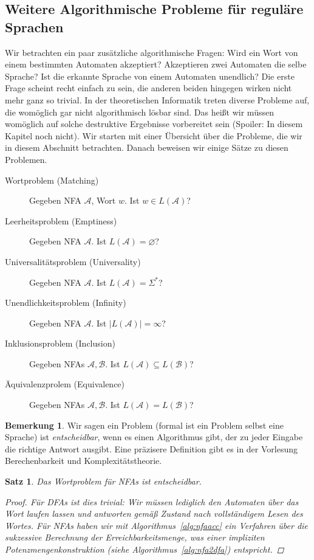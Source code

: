 \documentclass[11pt, a4paper]{article}
\theoremstyle{definition}
\newtheorem*{remark*}{Bemerkung}
\theoremstyle{plain}
\newtheorem{theorem}[definition]{Satz}
\numberwithin{equation}{section}
\let\emptyset\varnothing
\begin{document}
\subsection{Weitere Algorithmische Probleme für reguläre Sprachen}\label{sec:regular_algorithms}
Wir betrachten ein paar zusätzliche algorithmische Fragen: Wird ein Wort von einem bestimmten Automaten akzeptiert? Akzeptieren zwei Automaten die selbe Sprache? Ist die erkannte Sprache von einem Automaten unendlich? Die erste Frage scheint recht einfach zu sein, die anderen beiden hingegen wirken nicht mehr ganz so trivial. In der theoretischen Informatik treten diverse Probleme auf, die womöglich gar nicht algorithmisch lösbar sind. Das heißt wir müssen womöglich auf solche destruktive Ergebnisse vorbereitet sein (Spoiler: In diesem Kapitel noch nicht). Wir starten mit einer Übersicht über die Probleme, die wir in diesem Abschnitt betrachten. Danach beweisen wir einige Sätze zu diesen Problemen.
\begin{description}
	\item[Wortproblem (Matching)] Gegeben NFA $\mathcal{A}$, Wort $w$. Ist $w \in L(\mathcal{A})$?
	\item[Leerheitsproblem (Emptiness)] Gegeben NFA $\mathcal{A}$. Ist $L(\mathcal{A}) = \emptyset$?
	\item[Universalitätsproblem (Universality)] Gegeben NFA $\mathcal{A}$. Ist $L(\mathcal{A}) = \Sigma^\ast$?
	\item[Unendlichkeitsproblem (Infinity)] Gegeben NFA $\mathcal{A}$. Ist $|L(\mathcal{A})| = \infty$?
	\item[Inklusionsproblem (Inclusion)] Gegeben NFAs $\mathcal{A}, \mathcal{B}$. Ist $L(\mathcal{A}) \subseteq L(\mathcal{B})$?
	\item[Äquivalenzprolem (Equivalence)] Gegeben NFAs $\mathcal{A}, \mathcal{B}$. Ist $L(\mathcal{A}) = L(\mathcal{B})$?
\end{description}
\begin{remark*}
	Wir sagen ein Problem (formal ist ein Problem selbst eine Sprache) ist \textit{entscheidbar}, wenn es einen Algorithmus gibt, der zu jeder Eingabe die richtige Antwort ausgibt. Eine präzisere Definition gibt es in der Vorlesung Berechenbarkeit und Komplexitätstheorie.
\end{remark*}
\begin{theorem}\label{thm:nfa_matching}
	Das Wortproblem für NFAs ist entscheidbar.
	\begin{proof}
		Für DFAs ist dies trivial: Wir müssen lediglich den Automaten über das Wort laufen lassen und antworten gemäß Zustand nach vollständigem Lesen des Wortes. Für NFAs haben wir mit Algorithmus~\ref{alg:nfaacc} ein Verfahren über die sukzessive Berechnung der Erreichbarkeitsmenge, was einer impliziten Potenzmengenkonstruktion (siehe Algorithmus~\ref{alg:nfa2dfa}) entspricht.
	\end{proof}
\end{theorem}
\end{document}
